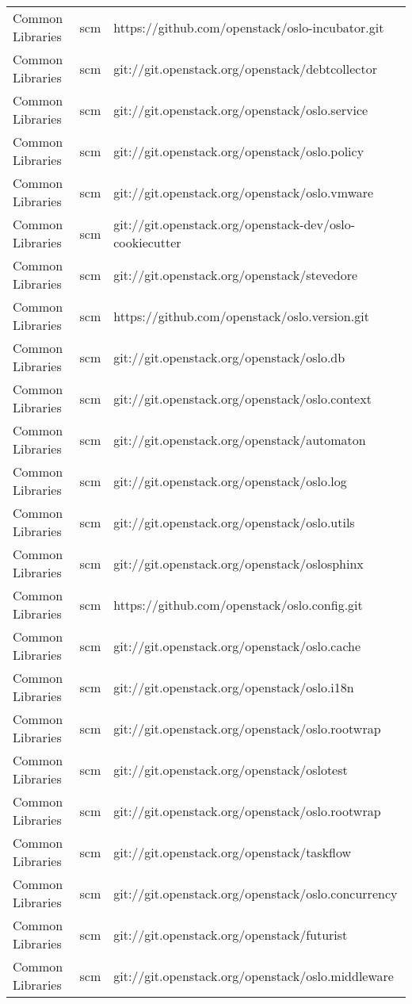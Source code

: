 \begin{center}
\begin{longtable}{|p{4cm}|p{1cm}|p{10cm}|}
Common Libraries&scm&https://github.com/openstack/oslo-incubator.git\\ 
Common Libraries&scm&git://git.openstack.org/openstack/debtcollector\\ 
Common Libraries&scm&git://git.openstack.org/openstack/oslo.service\\ 
Common Libraries&scm&git://git.openstack.org/openstack/oslo.policy\\ 
Common Libraries&scm&git://git.openstack.org/openstack/oslo.vmware\\ 
Common Libraries&scm&git://git.openstack.org/openstack-dev/oslo-cookiecutter\\ 
Common Libraries&scm&git://git.openstack.org/openstack/stevedore\\ 
Common Libraries&scm&https://github.com/openstack/oslo.version.git\\ 
Common Libraries&scm&git://git.openstack.org/openstack/oslo.db\\ 
Common Libraries&scm&git://git.openstack.org/openstack/oslo.context\\ 
Common Libraries&scm&git://git.openstack.org/openstack/automaton\\ 
Common Libraries&scm&git://git.openstack.org/openstack/oslo.log\\ 
Common Libraries&scm&git://git.openstack.org/openstack/oslo.utils\\ 
Common Libraries&scm&git://git.openstack.org/openstack/oslosphinx\\ 
Common Libraries&scm&https://github.com/openstack/oslo.config.git\\ 
Common Libraries&scm&git://git.openstack.org/openstack/oslo.cache\\ 
Common Libraries&scm&git://git.openstack.org/openstack/oslo.i18n\\ 
Common Libraries&scm&git://git.openstack.org/openstack/oslo.rootwrap\\ 
Common Libraries&scm&git://git.openstack.org/openstack/oslotest\\ 
Common Libraries&scm&git://git.openstack.org/openstack/oslo.rootwrap\\ 
Common Libraries&scm&git://git.openstack.org/openstack/taskflow\\ 
Common Libraries&scm&git://git.openstack.org/openstack/oslo.concurrency\\ 
Common Libraries&scm&git://git.openstack.org/openstack/futurist\\ 
Common Libraries&scm&git://git.openstack.org/openstack/oslo.middleware\\ 

\end{longtable}
\end{center}

